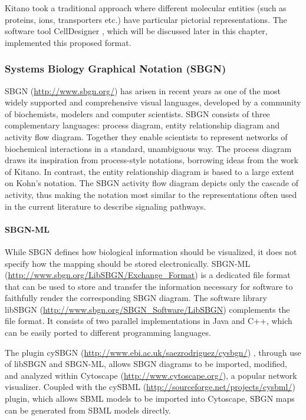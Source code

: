 \documentclass[]{article}
\begin{document}
Kitano \autocite{Kitano2003} took a traditional approach where different
molecular entities (such as proteins, ions, transporters etc.) have
particular pictorial representations. The software tool CellDesigner
\autocite{CellDesigner2003}, which will be discussed later in this
chapter, implemented this proposed format.

\subsubsection{Systems Biology Graphical Notation (SBGN)}

SBGN (\url{http://www.sbgn.org/}) \autocite{le2009systems} has arisen in
recent years as one of the most widely supported and comprehensive
visual languages, developed by a community of biochemists, modelers and
computer scientists. SBGN consists of three complementary languages:
process diagram, entity relationship diagram and activity flow diagram.
Together they enable scientists to represent networks of biochemical
interactions in a standard, unambiguous way. The process diagram draws
its inspiration from process-style notations, borrowing ideas from the
work of Kitano. In contrast, the entity relationship diagram is based to
a large extent on Kohn's notation. The SBGN activity flow diagram
depicts only the cascade of activity, thus making the notation most
similar to the representations often used in the current literature to
describe signaling pathways.

\paragraph{SBGN-ML}

While SBGN defines how biological information should be visualized, it
does not specify how the mapping should be stored electronically.
SBGN-ML (\url{http://www.sbgn.org/LibSBGN/Exchange_Format})
\autocite{le2010report} is a dedicated file format that can be used to
store and transfer the information necessary for software to faithfully
render the corresponding SBGN diagram. The software library libSBGN
(\url{http://www.sbgn.org/SBGN_Software/LibSBGN}) complements the file
format. It consists of two parallel implementations
\autocite{van2012software} in Java and C++, which can be easily ported
to different programming languages.

The plugin cySBGN (\url{http://www.ebi.ac.uk/saezrodriguez/cysbgn/})
\autocite{goncalves2013cysbgn}, through use of libSBGN and SBGN-ML,
allows SBGN diagrams to be imported, modified, and analyzed within
Cytoscape (\url{http://www.cytoscape.org/}), a popular network
visualizer. Coupled with the cySBML
(\url{http://sourceforge.net/projects/cysbml/})
\autocite{konig2012cysbml} plugin, which allows SBML models to be
imported into Cytoscape, SBGN maps can be generated from SBML models
directly.
\end{document}
